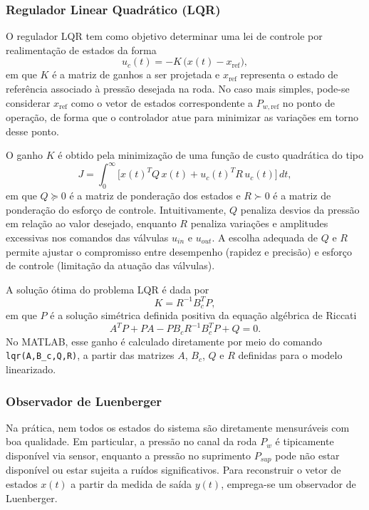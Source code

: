 \subsubsection*{Regulador Linear Quadrático (LQR)}

O regulador LQR tem como objetivo determinar uma lei de controle por realimentação de estados da forma
\[
    u_c(t) = -K\,\big(x(t) - x_{\text{ref}}\big),
\]
em que $K$ é a matriz de ganhos a ser projetada e $x_{\text{ref}}$ representa o estado de referência associado à pressão desejada na roda. No caso mais simples, pode-se considerar $x_{\text{ref}}$ como o vetor de estados correspondente a $P_{w,\text{ref}}$ no ponto de operação, de forma que o controlador atue para minimizar as variações em torno desse ponto.

O ganho $K$ é obtido pela minimização de uma função de custo quadrática do tipo
\[
    J = \int_{0}^{\infty}
        \Big[
            x(t)^{T} Q\,x(t)
            + u_c(t)^{T} R\,u_c(t)
        \Big]\,dt,
\]
em que $Q \succeq 0$ é a matriz de ponderação dos estados e $R \succ 0$ é a matriz de ponderação do esforço de controle. Intuitivamente, $Q$ penaliza desvios da pressão em relação ao valor desejado, enquanto $R$ penaliza variações e amplitudes excessivas nos comandos das válvulas $u_{in}$ e $u_{out}$. A escolha adequada de $Q$ e $R$ permite ajustar o compromisso entre desempenho (rapidez e precisão) e esforço de controle (limitação da atuação das válvulas).

A solução ótima do problema LQR é dada por
\[
    K = R^{-1} B_c^{T} P,
\]
em que $P$ é a solução simétrica definida positiva da equação algébrica de Riccati
\[
    A^{T} P + P A - P B_c R^{-1} B_c^{T} P + Q = 0.
\]
No MATLAB, esse ganho é calculado diretamente por meio do comando \texttt{lqr(A,B\_c,Q,R)}, a partir das matrizes $A$, $B_c$, $Q$ e $R$ definidas para o modelo linearizado.

\subsubsection*{Observador de Luenberger}

Na prática, nem todos os estados do sistema são diretamente mensuráveis com boa qualidade. Em particular, a pressão no canal da roda $P_w$ é tipicamente disponível via sensor, enquanto a pressão no suprimento $P_{sup}$ pode não estar disponível ou estar sujeita a ruídos significativos. Para reconstruir o vetor de estados $x(t)$ a partir da medida de saída $y(t)$, emprega-se um observador de Luenberger.

